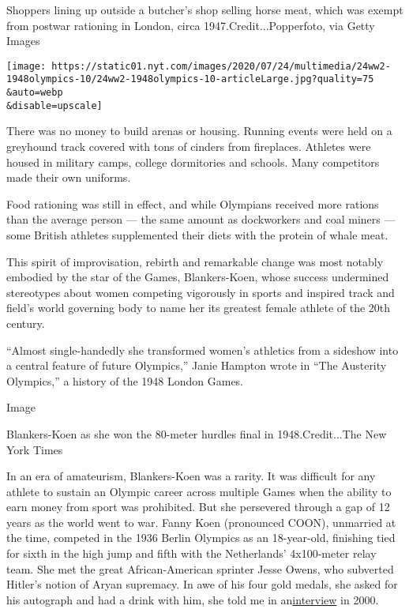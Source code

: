 Shoppers lining up outside a butcher's shop selling horse meat, which
was exempt from postwar rationing in London, circa
1947.Credit...Popperfoto, via Getty Images

\texttt{[image: https://static01.nyt.com/images/2020/07/24/multimedia/24ww2-1948olympics-10/24ww2-1948olympics-10-articleLarge.jpg?quality=75\\\&auto=webp\\\&disable=upscale]}

There was no money to build arenas or housing. Running events were held
on a greyhound track covered with tons of cinders from fireplaces.
Athletes were housed in military camps, college dormitories and schools.
Many competitors made their own uniforms.

Food rationing was still in effect, and while Olympians received more
rations than the average person --- the same amount as dockworkers and
coal miners --- some British athletes supplemented their diets with the
protein of whale meat.

This spirit of improvisation, rebirth and remarkable change was most
notably embodied by the star of the Games, Blankers-Koen, whose success
undermined stereotypes about women competing vigorously in sports and
inspired track and field's world governing body to name her its greatest
female athlete of the 20th century.

``Almost single-handedly she transformed women's athletics from a
sideshow into a central feature of future Olympics,'' Janie Hampton
wrote in ``The Austerity Olympics,'' a history of the 1948 London Games.

Image

Blankers-Koen as she won the 80-meter hurdles final in 1948.Credit...The
New York Times

In an era of amateurism, Blankers-Koen was a rarity. It was difficult
for any athlete to sustain an Olympic career across multiple Games when
the ability to earn money from sport was prohibited. But she persevered
through a gap of 12 years as the world went to war. Fanny Koen
(pronounced COON), unmarried at the time, competed in the 1936 Berlin
Olympics as an 18-year-old, finishing tied for sixth in the high jump
and fifth with the Netherlands' 4x100-meter relay team. She met the
great African-American sprinter Jesse Owens, who subverted Hitler's
notion of Aryan supremacy. In awe of his four gold medals, she asked for
his autograph and had a drink with him, she told me in
an\href{https://archive.nytimes.com/www.nytimes.com/library/sports/olympics/071100oly-longman-column.html}{interview}
in 2000.

